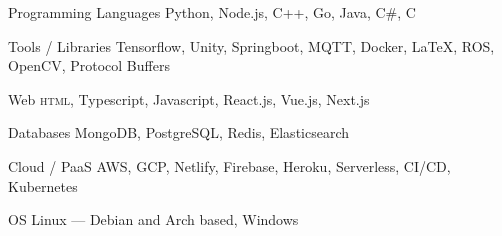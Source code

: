 

\begin{cvskills}

  \cvskill
  {Programming Languages} %
  {Python, Node.js, C++, Go, Java, C\#, C} %

  \cvskill
  {Tools / Libraries} %
  {Tensorflow, Unity, Springboot, MQTT, Docker, \LaTeX, ROS, OpenCV, Protocol Buffers} %

  \cvskill
  {Web} %
  {\textsc{html}, Typescript, Javascript, React.js, Vue.js, Next.js} %

  \cvskill
  {Databases} %
  {MongoDB, PostgreSQL, Redis, Elasticsearch} %

  \cvskill
  {Cloud / PaaS} %
  {AWS, GCP, Netlify, Firebase, Heroku, Serverless, CI/CD, Kubernetes} %

  \cvskill
  {OS} %
  {Linux --- Debian and Arch based, Windows} %

\end{cvskills}
